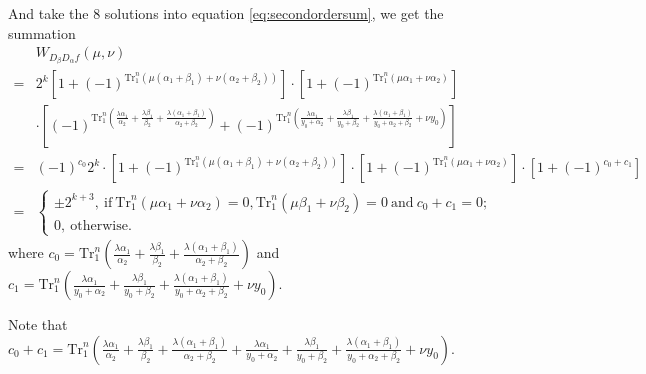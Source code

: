 \documentclass[runningheads,a4paper]{article}
\newcommand{\F}{\mathbb{F}}
\newcommand{\0}{\textbf{0}}
\newcommand{\1}{\textbf{1}}
\renewcommand{\Tr}{\mathrm{Tr}_1^n}
\begin{document}
    And take the $ 8 $ solutions into equation \eqref{eq:secondordersum}, we get the summation
    \begin{align}\label{eq:case2kplus3}
        &W_{D_{\beta}D_{\alpha}f}(\mu,\nu)\nonumber\\
        =&2^k\left[1+(-1)^{\Tr\left(\mu(\alpha_1+\beta_1)+\nu (\alpha_2+\beta_2)\right)}\right]\cdot
        \left[1+(-1)^{\Tr\left(\mu\alpha_1+\nu\alpha_2\right)}\right]\nonumber\\
        &\cdot
        \left[(-1)^{\Tr\left(\frac{\lambda\alpha_1}{\alpha_2}+\frac{\lambda\beta_1}{\beta_2}+\frac{\lambda(\alpha_1+\beta_1)}{\alpha_2+\beta_2}\right)}+(-1)^{\Tr\left(\frac{\lambda\alpha_1}{y_0+\alpha_2}+\frac{\lambda\beta_1}{y_0+\beta_2}+\frac{\lambda(\alpha_1+\beta_1)}{y_0+\alpha_2+\beta_2}+\nu y_0\right)}\right]\nonumber\\
        =&(-1)^{c_0}2^k\cdot\left[1+(-1)^{\Tr\left(\mu(\alpha_1+\beta_1)+\nu (\alpha_2+\beta_2)\right)}\right]\cdot
        \left[1+(-1)^{\Tr\left(\mu\alpha_1+\nu\alpha_2\right)}\right]\cdot\left[1+(-1)^{c_0+c_1}\right]\nonumber\\
        =&\begin{cases}
            \pm 2^{k+3},~\text{if}~ \Tr\left(\mu\alpha_1+\nu\alpha_2\right)=0 , \Tr\left(\mu\beta_1+\nu\beta_2\right)=0 ~\text{and}~ c_0+c_1=0;\\
            0,~\text{otherwise}.
        \end{cases}
    \end{align}
    where $ c_0=\Tr\left(\frac{\lambda\alpha_1}{\alpha_2}+\frac{\lambda\beta_1}{\beta_2}+\frac{\lambda(\alpha_1+\beta_1)}{\alpha_2+\beta_2}\right) $ and 
    $ c_1= \Tr\left(\frac{\lambda\alpha_1}{y_0+\alpha_2}+\frac{\lambda\beta_1}{y_0+\beta_2}+\frac{\lambda(\alpha_1+\beta_1)}{y_0+\alpha_2+\beta_2}+\nu y_0\right)$.


    Note that $ c_0+c_1=\Tr\left(\frac{\lambda\alpha_1}{\alpha_2}+\frac{\lambda\beta_1}{\beta_2}+\frac{\lambda(\alpha_1+\beta_1)}{\alpha_2+\beta_2}+\frac{\lambda\alpha_1}{y_0+\alpha_2}+\frac{\lambda\beta_1}{y_0+\beta_2}+\frac{\lambda(\alpha_1+\beta_1)}{y_0+\alpha_2+\beta_2}+\nu y_0\right) $.
\end{document}
